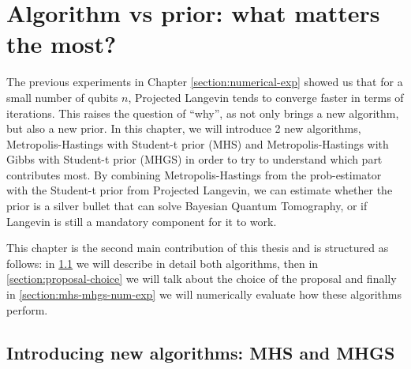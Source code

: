 \documentclass[12pt]{memoir}
\begin{document}
\chapter{Algorithm vs prior: what matters the most?}\label{section:algo-vs-prior}
The previous experiments in Chapter \ref{section:numerical-exp} showed us that for a small number of qubits $n$, Projected Langevin tends to converge faster in terms of iterations. This raises the question of ``why'', as \cite{meth:bayesian:Langevin:ACMT2024} not only brings a new algorithm, but also a new prior. In this chapter, we will introduce 2 new algorithms, Metropolis-Hastings with Student-t prior (MHS) and Metropolis-Hastings with Gibbs with Student-t prior (MHGS) in order to try to understand which part contributes most. By combining Metropolis-Hastings from the prob-estimator with the Student-t prior from Projected Langevin, we can estimate whether the prior is a silver bullet that can solve Bayesian Quantum Tomography, or if Langevin is still a mandatory component for it to work.\medbreak

This chapter is the second main contribution of this thesis and is structured as follows: in \ref{section:mhs-and-mhgs} we will describe in detail both algorithms, then in \ref{section:proposal-choice} we will talk about the choice of the proposal and finally in \ref{section:mhs-mhgs-num-exp} we will numerically evaluate how these algorithms perform.
\section{Introducing new algorithms: MHS and MHGS}\label{section:mhs-and-mhgs}
\end{document}
